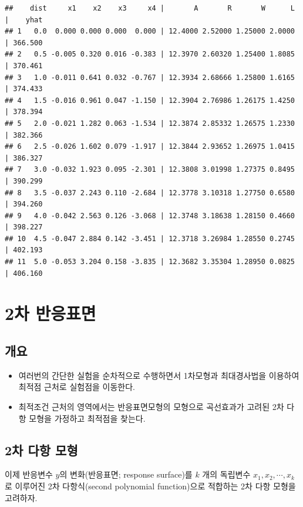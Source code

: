 \documentclass[
]{book}
\theoremstyle{definition}
\theoremstyle{definition}
\theoremstyle{definition}
\theoremstyle{definition}
\theoremstyle{remark}
\begin{document}
\begin{verbatim}
##    dist     x1    x2    x3     x4 |       A       R       W      L |    yhat
## 1   0.0  0.000 0.000 0.000  0.000 | 12.4000 2.52000 1.25000 2.0000 | 366.500
## 2   0.5 -0.005 0.320 0.016 -0.383 | 12.3970 2.60320 1.25400 1.8085 | 370.461
## 3   1.0 -0.011 0.641 0.032 -0.767 | 12.3934 2.68666 1.25800 1.6165 | 374.433
## 4   1.5 -0.016 0.961 0.047 -1.150 | 12.3904 2.76986 1.26175 1.4250 | 378.394
## 5   2.0 -0.021 1.282 0.063 -1.534 | 12.3874 2.85332 1.26575 1.2330 | 382.366
## 6   2.5 -0.026 1.602 0.079 -1.917 | 12.3844 2.93652 1.26975 1.0415 | 386.327
## 7   3.0 -0.032 1.923 0.095 -2.301 | 12.3808 3.01998 1.27375 0.8495 | 390.299
## 8   3.5 -0.037 2.243 0.110 -2.684 | 12.3778 3.10318 1.27750 0.6580 | 394.260
## 9   4.0 -0.042 2.563 0.126 -3.068 | 12.3748 3.18638 1.28150 0.4660 | 398.227
## 10  4.5 -0.047 2.884 0.142 -3.451 | 12.3718 3.26984 1.28550 0.2745 | 402.193
## 11  5.0 -0.053 3.204 0.158 -3.835 | 12.3682 3.35304 1.28950 0.0825 | 406.160
\end{verbatim}

\hypertarget{secondorder}{%
\chapter{2차 반응표면}\label{secondorder}}

\hypertarget{uxac1cuxc694-1}{%
\section{개요}\label{uxac1cuxc694-1}}

\begin{itemize}
\item
  여러번의 간단한 실험을 순차적으로 수행하면서 1차모형과 최대경사법을 이용하여 최적점 근처로 실험점을 이동한다.
\item
  최적조건 근처의 영역에서는 반응표면모형의 모형으로 곡선효과가 고려된 2차 다항 모형을 가정하고 최적점을 찾는다.
\end{itemize}

\hypertarget{uxcc28-uxb2e4uxd56d-uxbaa8uxd615}{%
\section{2차 다항 모형}\label{uxcc28-uxb2e4uxd56d-uxbaa8uxd615}}

이제 반응변수 \(y\)의 변화(반응표면; response surface)를 \(k\) 개의 독립변수 \(x_1, x_2, \cdots, x_k\) 로 이루어진 2차 다항식(second polynomial function)으로 적합하는 2차 다항 모형을 고려하자.
\end{document}
